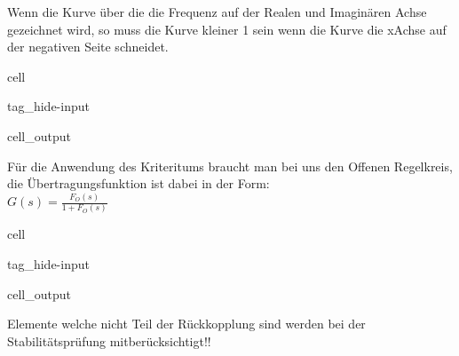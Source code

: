 \documentclass[letterpaper,10pt,english]{jupyterBook}
\begin{document}
\begin{DUlineblock}{0em}
\item[] 
\end{DUlineblock}

\sphinxAtStartPar
Wenn die Kurve über die die Frequenz auf der Realen und Imaginären Achse gezeichnet wird, so muss die Kurve kleiner 1 sein wenn die Kurve die x\sphinxhyphen{}Achse auf der negativen Seite schneidet.

\begin{sphinxuseclass}{cell}
\begin{sphinxuseclass}{tag_hide-input}\begin{sphinxVerbatimOutput}

\begin{sphinxuseclass}{cell_output}
\begin{sphinxVerbatim}[commandchars=\\\{\}]
\PYGZsq{}\PYGZsq{}
\end{sphinxVerbatim}

\noindent{}

\end{sphinxuseclass}\end{sphinxVerbatimOutput}

\end{sphinxuseclass}
\end{sphinxuseclass}
\begin{DUlineblock}{0em}
\item[] 
\end{DUlineblock}

\sphinxAtStartPar
Für die Anwendung des Kriteritums braucht man \sphinxhyphen{} bei uns \sphinxhyphen{} den Offenen Regelkreis,
die Übertragungsfunktion ist dabei in der Form:\\
\(G(s) = \frac{F_O(s)}{1 + F_O(s)}\)

\begin{sphinxuseclass}{cell}
\begin{sphinxuseclass}{tag_hide-input}\begin{sphinxVerbatimOutput}

\begin{sphinxuseclass}{cell_output}
\noindent{}

\end{sphinxuseclass}\end{sphinxVerbatimOutput}

\end{sphinxuseclass}
\end{sphinxuseclass}
\sphinxAtStartPar
Elemente welche nicht Teil der Rückkopplung sind werden bei der Stabilitätsprüfung  mitberücksichtigt!!
\end{document}
